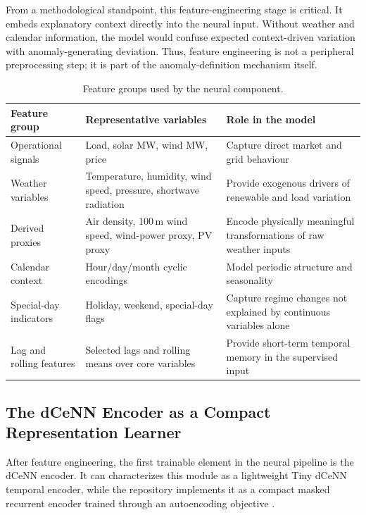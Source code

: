 From a methodological standpoint, this feature-engineering stage is critical. It embeds explanatory context directly into the neural input. Without weather and calendar information, the model would confuse expected context-driven variation with anomaly-generating deviation. Thus, feature engineering is not a peripheral preprocessing step; it is part of the anomaly-definition mechanism itself.

\begin{table}[H]
	\centering
	\caption{Feature groups used by the neural component.}
	\label{tab:neural_feature_groups}
	\small
	\begin{tabular}{|p{3.0cm}|p{6.0cm}|p{3.0cm}|}
		\hline
		\textbf{Feature group} & \textbf{Representative variables} & \textbf{Role in the model} \\
		\hline
		Operational signals & Load, solar MW, wind MW, price & Capture direct market and grid behaviour \\
		\hline
		Weather variables & Temperature, humidity, wind speed, pressure, shortwave radiation & Provide exogenous drivers of renewable and load variation \\
		\hline
		Derived proxies & Air density, 100\,m wind speed, wind-power proxy, PV proxy & Encode physically meaningful transformations of raw weather inputs \\
		\hline
		Calendar context & Hour/day/month cyclic encodings & Model periodic structure and seasonality \\
		\hline
		Special-day indicators & Holiday, weekend, special-day flags & Capture regime changes not explained by continuous variables alone \\
		\hline
		Lag and rolling features & Selected lags and rolling means over core variables & Provide short-term temporal memory in the supervised input \\
		\hline
	\end{tabular}
\end{table}

\subsection{The dCeNN Encoder as a Compact Representation Learner}

After feature engineering, the first trainable element in the neural pipeline is the dCeNN encoder. It can characterizes this module as a lightweight Tiny dCeNN temporal encoder, while the repository implements it as a compact masked recurrent encoder trained through an autoencoding objective \cite{repo_thesis_grid_anomaly}.

